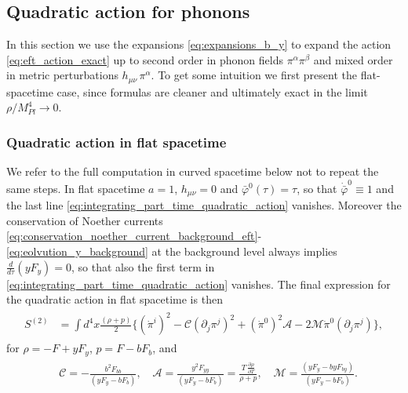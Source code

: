 \subsection{Quadratic action for phonons}
%
In this section we use the expansions \eqref{eq:expansions_b_y} to expand the action \eqref{eq:eft_action_exact} up to second order in phonon fields $\pi^\alpha \pi^\beta$ and mixed order in metric perturbations $h_{\mu\nu}\,\pi^\alpha$.
To get some intuition we first present the flat-spacetime case, since formulas are cleaner and  ultimately exact in the limit $\rho/ M_{Pl}^{4}\to0$.

\subsubsection{Quadratic action in flat spacetime}
%
We refer to the full computation in curved spacetime below not to repeat the same steps.
In flat spacetime $a=1$, $h_{\mu\nu}=0$ and $\bar{\varphi}^0(\tau)= \tau$, so that $\dot{\bar{\varphi}}^0\equiv 1$ and the last line \eqref{eq:integrating_part_time_quadratic_action} vanishes.
Moreover the conservation of Noether currents \eqref{eq:conservation_noether_current_background_eft}-\eqref{eq:eolvution_y_background} at the background level always implies $\tfrac{d}{d\tau}(yF_y)=0$, so that also the first term in \eqref{eq:integrating_part_time_quadratic_action} vanishes.
The final expression for the quadratic action in flat spacetime is then
{\small\begin{align}
\begin{aligned}
    S^{(2)}&=\int d^4x \frac{(\rho+p)}{2}\bigg\{(\dot{\pi}^i)^2 - \mathcal{C} (\partial_j\pi^j)^2 
    + (\dot{\pi}^0)^2 \mathcal{A}
    - 2\mathcal{M}\dot{\pi}^0 (\partial_j \pi^j)
    \bigg\},
\end{aligned}
\end{align}}
for $\rho= -F + y F_y$, $p= F - b F_b$, and 
{\small\begin{align}\label{eq:mixing_coefficients_entropy_phonons}
\begin{aligned}
    &\mathcal{C} = -\frac{b^2F_{bb}}{(yF_y-bF_b)},\quad 
    \mathcal{A} = \frac{y^2F_{yy}}{(yF_y-bF_b)} = \frac{T\, \frac{\partial\rho }{\partial T}}{\rho+p},\quad
    \mathcal{M} = \frac{(yF_y-byF_{by})}{(yF_y-bF_b)}.
\end{aligned}
\end{align}}

